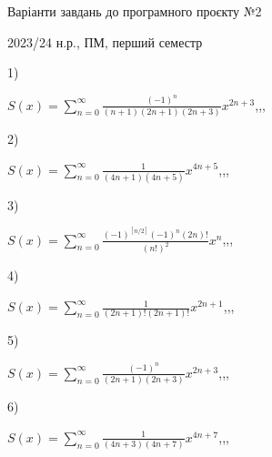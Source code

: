 \documentclass[11pt, ukrainian]{article}
\begin{document}
{\Large \center  Варіанти завдань до програмного проєкту №2\par 2023/24 н.р., ПМ, перший семестр\par \bigskip}
1) \space 
{%
{$S(x)=\sum\limits_{n=0}^{\infty}{\frac{(-1)^n}{(n+1)(2n+1)(2n+3)}}{x^{{2n+3}}}$},,, \par \smallskip  
}
\par
\vspace{0.9cm}
2) \space 
{%
{$S(x)=\sum\limits_{n=0}^{\infty}{\frac{1}{(4n+1)(4n+5)}}{x^{{4n+5}}}$},,, \par \smallskip  
}
\par
\vspace{0.9cm}
3) \space 
{%
{$S(x)=\sum\limits_{n=0}^{\infty}{\frac{{(-1)^{[n/2]}}{(-1)^n}(2n)!}{(n!)^2}}{x^{n}}$},,, \par \smallskip  
}
\par
\vspace{0.9cm}
4) \space 
{%
{$S(x)=\sum\limits_{n=0}^{\infty}{\frac{1}{(2n+1)!(2n+1)!}}{x^{{2n+1}}}$},,, \par \smallskip  
}
\par
\vspace{0.9cm}
5) \space 
{%
{$S(x)=\sum\limits_{n=0}^{\infty}{\frac{(-1)^n}{(2n+1)(2n+3)}}{x^{{2n+3}}}$},,, \par \smallskip  
}
\par
\vspace{0.9cm}
6) \space 
{%
{$S(x)=\sum\limits_{n=0}^{\infty}{\frac{1}{(4n+3)(4n+7)}}{x^{{4n+7}}}$},,, \par \smallskip  
}
\end{document}
